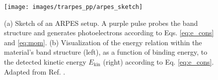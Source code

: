 \begin{figure}
	\centering
	\texttt{[image: images/trarpes\_pp/arpes\_sketch]}
	\caption{(a) Sketch of an ARPES setup. A purple pulse probes the band structure and generates photoelectrons according to Eqs. \ref{eq:e_cons} and \ref{eq:mom}. (b) Visualization of the energy relation within the material’s band structure (left), as a function of binding energy, to the detected kinetic energy $E_\text{kin}$ (right) according to Eq. \ref{eq:e_cons}. Adapted from Ref. \cite{hufner_photoelectron_1995}.}
	\label{fig:arpes_sketch}
\end{figure}

